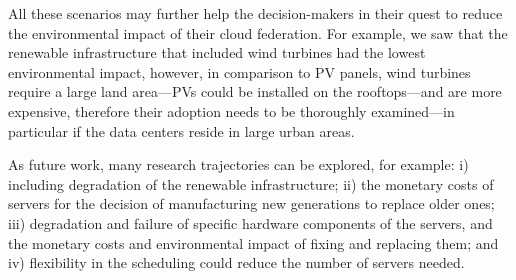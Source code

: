All these scenarios may further help the decision-makers in their quest to reduce the environmental impact of their cloud federation. For example, we saw that the renewable infrastructure that included wind turbines had the lowest environmental impact, however, in comparison to PV panels, wind turbines require a large land area---PVs could be installed on the rooftops---and are more expensive, therefore their adoption needs to be thoroughly examined---in particular if the data centers reside in large urban areas. 

As future work, many research trajectories can be explored, for example: i) including degradation of the renewable infrastructure; ii) the monetary costs of servers for the decision of manufacturing new generations to replace older ones; iii) degradation and failure of specific hardware components of the servers, and the monetary costs and environmental impact of fixing and replacing them; and iv) flexibility in the scheduling could reduce the number of servers needed.
